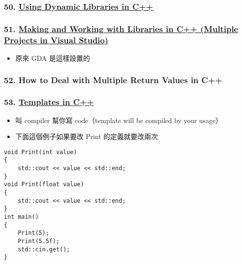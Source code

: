 \documentclass[11pt]{article}
\providecommand{\tightlist}{%
      \setlength{\itemsep}{0pt}\setlength{\parskip}{0pt}}
\begin{document}
\hypertarget{using-dynamic-libraries-in-c}{%
\subsubsection{\texorpdfstring{50.
\href{https://www.youtube.com/watch?v=pLy69V2F_8M\&list=PLlrATfBNZ98dudnM48yfGUldqGD0S4FFb\&index=51\&t=0s}{Using
Dynamic Libraries in
C++}}{50. Using Dynamic Libraries in C++}}\label{using-dynamic-libraries-in-c}}

\hypertarget{making-and-working-with-libraries-in-c-multiple-projects-in-visual-studio}{%
\subsubsection{\texorpdfstring{51.
\href{https://www.youtube.com/watch?v=Wt4dxDNmDA8\&list=PLlrATfBNZ98dudnM48yfGUldqGD0S4FFb\&index=52\&t=0s}{Making
and Working with Libraries in C++ (Multiple Projects in Visual
Studio)}}{51. Making and Working with Libraries in C++ (Multiple Projects in Visual Studio)}}\label{making-and-working-with-libraries-in-c-multiple-projects-in-visual-studio}}

\begin{itemize}
\tightlist
\item
  原來 GDA 是這樣設置的
\end{itemize}

\hypertarget{how-to-deal-with-multiple-return-values-in-c}{%
\subsubsection{52. How to Deal with Multiple Return Values in
C++}\label{how-to-deal-with-multiple-return-values-in-c}}

\hypertarget{templates-in-c}{%
\subsubsection{\texorpdfstring{53.
\href{https://www.youtube.com/watch?v=I-hZkUa9mIs\&list=PLlrATfBNZ98dudnM48yfGUldqGD0S4FFb\&index=53}{Templates
in C++}}{53. Templates in C++}}\label{templates-in-c}}

\begin{itemize}
\tightlist
\item
  叫 compiler 幫你寫 code（template will be compiled by your usage）
\item
  下面這個例子如果要改 Print 的定義就要改兩次
\end{itemize}

\begin{verbatim}
void Print(int value)
{
    std::cout << value << std::end;
}
void Print(float value)
{
    std::cout << value << std::end;
}
int main()
{
    Print(5);
    Print(5.5f);
    std::cin.get();
}
\end{verbatim}
\end{document}
